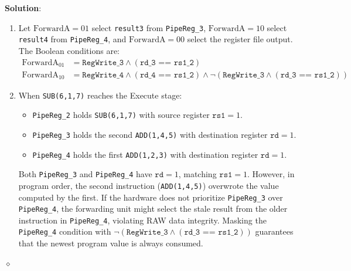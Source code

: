 \begin{problem}
\textbf{Solution}:
\begin{enumerate}
    \item Let $\text{ForwardA} = 01$ select \texttt{result3} from \texttt{PipeReg\_3}, $\text{ForwardA} = 10$ select \texttt{result4} from \texttt{PipeReg\_4}, and $\text{ForwardA} = 00$ select the register file output. The Boolean conditions are:
    \begin{align*}
    \text{ForwardA}_{01} &= \texttt{RegWrite\_3} \land (\texttt{rd\_3 == rs1\_2}) \\
    \text{ForwardA}_{10} &= \texttt{RegWrite\_4} \land (\texttt{rd\_4 == rs1\_2}) \land \neg(\texttt{RegWrite\_3} \land (\texttt{rd\_3 == rs1\_2}))
    \end{align*}
    \item When \texttt{SUB(6,1,7)} reaches the Execute stage:
    \begin{itemize}
        \item \texttt{PipeReg\_2} holds \texttt{SUB(6,1,7)} with source register $\texttt{rs1} = 1$.
        \item \texttt{PipeReg\_3} holds the second \texttt{ADD(1,4,5)} with destination register $\texttt{rd} = 1$.
        \item \texttt{PipeReg\_4} holds the first \texttt{ADD(1,2,3)} with destination register $\texttt{rd} = 1$.
    \end{itemize}
    Both \texttt{PipeReg\_3} and \texttt{PipeReg\_4} have $\texttt{rd} = 1$, matching $\texttt{rs1} = 1$. However, in program order, the second instruction (\texttt{ADD(1,4,5)}) overwrote the value computed by the first. If the hardware does not prioritize \texttt{PipeReg\_3} over \texttt{PipeReg\_4}, the forwarding unit might select the stale result from the older instruction in \texttt{PipeReg\_4}, violating RAW data integrity. Masking the \texttt{PipeReg\_4} condition with $\neg(\texttt{RegWrite\_3} \land (\texttt{rd\_3 == rs1\_2}))$ guarantees that the newest program value is always consumed.
\end{enumerate}
$\diamond$
\end{problem}

